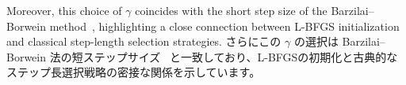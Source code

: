 \documentclass[0_main]{subfiles}
\begin{document}
\ifEn
    Moreover, this choice of $\gamma$ coincides with the short step size of the Barzilai--Borwein method~\citep{barzilaiTwoPointStepSize1988}, highlighting a close connection between L-BFGS initialization and classical step-length selection strategies.
\else
    さらにこの $\gamma$ の選択は Barzilai--Borwein 法の短ステップサイズ~\citep{barzilaiTwoPointStepSize1988} と一致しており、L-BFGSの初期化と古典的なステップ長選択戦略の密接な関係を示しています。
\fi

\ifSubfilesClassLoaded{
    
    
}{}
\end{document}
